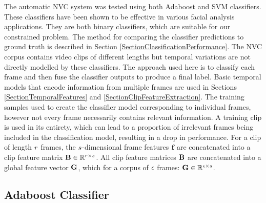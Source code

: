 The automatic \ac{NVC} system was tested using both Adaboost and \ac{SVM} classifiers. These classifiers have been shown to be effective in various facial analysis applications. They are both binary classifiers, which are suitable for our constrained problem. The method for comparing the classifier predictions to ground truth is described in Section \ref{SectionClassificationPerformance}. The \ac{NVC} corpus contains video clips of different lengths but temporal variations are not directly modelled by these classifiers. The approach used here is to classify each frame and then fuse the classifier outputs to produce a final label. 
Basic temporal models that encode information from multiple frames are used in Sections \ref{SectionTemporalFeatures} and \ref{SectionClipFeatureExtraction}. The training samples used to create the classifier model corresponding to individual frames, however not every frame necessarily contains relevant information. A training clip is used in its entirety, which can lead to a proportion of irrelevant frames being included in the classification model, resulting in a drop in performance. 
For a clip of length $r$ frames, the $s$-dimensional frame features $\textbf{f}$ are concatenated into a clip feature matrix $\textbf{B} \in \mathbb{R}^{r \times s}$. All clip feature matrices $\textbf{B}$ are concatenated into a global feature vector $\textbf{G}$, which for a corpus of $\epsilon$ frames: $\textbf{G} \in \mathbb{R}^{\epsilon \times s}$.


\subsection{Adaboost Classifier}
\label{SectionAdaboost}

